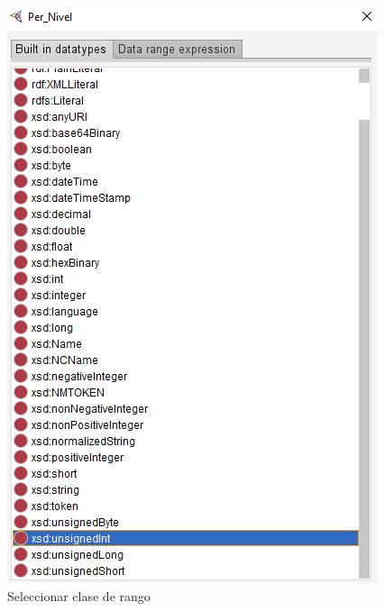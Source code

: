 \begin{enumerate}
    \begin{figure}[ht]
        \centering
        \includegraphics[scale=0.6]{Figures/Protege/CreateDataProp_6.png}
        \caption{Seleccionar clase de rango}
        \label{CreateDataProp_6}
    \end{figure}
\end{enumerate}

